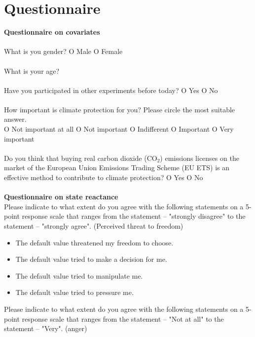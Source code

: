\documentclass[review, authoryear,12pt]{elsarticle}
\begin{document}
\clearpage

\section{Questionnaire} 
\label{appc}

\textbf{Questionnaire on covariates} \\
\\
What is you gender? O Male O Female \\
\\
What is your age? \\
\\
Have you participated in other experiments before today? O Yes O No \\
\\
How important is climate protection for you? Please circle the most suitable answer. \\
O Not important at all O Not important O Indifferent O Important O Very important\\
\\
Do you think that buying real carbon dioxide (CO$_2$) emissions licenses on the market of the European Union Emissions Trading Scheme (EU ETS) is an effective method to contribute to climate protection? O Yes O No \\
\\
\textbf{Questionnaire on state reactance} \\

Please indicate to what extent do you agree with the following statements on a 5-point response scale that ranges from the statement – "strongly disagree" to the statement – "strongly agree". (Perceived threat to freedom)\\

\begin{itemize}
\item The default value threatened my freedom to choose.
\item The default value tried to make a decision for me.
\item The default value tried to manipulate me.
\item The default value tried to pressure me.
\end{itemize}

Please indicate to what extent do you agree with the following statements on a 5-point response scale that ranges from the statement – "Not at all" to the statement – "Very". (anger) \\
\end{document}
